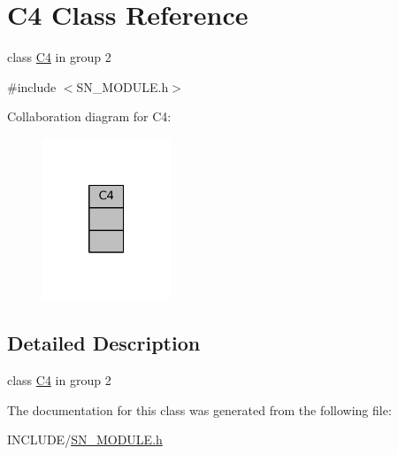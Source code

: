 \hypertarget{classC4}{}\section{C4 Class Reference}
\label{classC4}


class \hyperlink{classC4}{C4} in group 2  




{\ttfamily \#include $<$S\+N\+\_\+\+M\+O\+D\+U\+L\+E.\+h$>$}



Collaboration diagram for C4\+:
\nopagebreak
\begin{figure}[H]
\begin{center}
\leavevmode
\includegraphics[width=109pt]{classC4__coll__graph}
\end{center}
\end{figure}


\subsection{Detailed Description}
class \hyperlink{classC4}{C4} in group 2 

The documentation for this class was generated from the following file\+:\begin{DoxyCompactItemize}
\item 
I\+N\+C\+L\+U\+D\+E/\hyperlink{SN__MODULE_8h}{S\+N\+\_\+\+M\+O\+D\+U\+L\+E.\+h}\end{DoxyCompactItemize}
